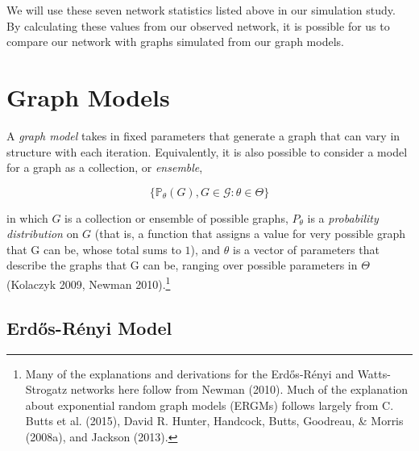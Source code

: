 \documentclass[12pt,twoside]{amherstthesis}
\begin{document}
  We will use these seven network statistics listed above in our
  simulation study. By calculating these values from our observed network,
  it is possible for us to compare our network with graphs simulated from
  our graph models.
  
  \chapter{Graph Models}\label{graph-models}
  
  A \emph{graph model} takes in fixed parameters that generate a graph
  that can vary in structure with each iteration. Equivalently, it is also
  possible to consider a model for a graph as a collection, or
  \emph{ensemble},
  
  \[\{\mathbb{P}_{\theta}(G), G \in \mathcal{G}: \theta \in \Theta\}\]
  
  in which \(G\) is a collection or ensemble of possible graphs,
  \(P_\theta\) is a \emph{probability distribution} on \(G\) (that is, a
  function that assigns a value for very possible graph that G can be,
  whose total sums to \(1\)), and \(\theta\) is a vector of parameters
  that describe the graphs that G can be, ranging over possible parameters
  in \(\Theta\) (Kolaczyk 2009, Newman 2010).\footnote{Many of the
    explanations and derivations for the Erdős-Rényi and Watts-Strogatz
    networks here follow from Newman (2010). Much of the explanation about
    exponential random graph models (ERGMs) follows largely from C. Butts
    et al. (2015), David R. Hunter, Handcock, Butts, Goodreau, \& Morris
    (2008a), and Jackson (2013).}
  
  \section{Erdős-Rényi Model}\label{erdos-renyi-model}
  
\end{document}

